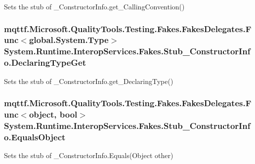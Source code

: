 Sets the stub of \-\_\-\-Constructor\-Info.\-get\-\_\-\-Calling\-Convention()

\hypertarget{class_system_1_1_runtime_1_1_interop_services_1_1_fakes_1_1_stub___constructor_info_a1eb244a5c2585282594fb4e58bd11649}{
\subsubsection[{Declaring\-Type\-Get}]{\setlength{\rightskip}{0pt plus 5cm}mqttf.\-Microsoft.\-Quality\-Tools.\-Testing.\-Fakes.\-Fakes\-Delegates.\-Func$<$global.\-System.\-Type$>$ System.\-Runtime.\-Interop\-Services.\-Fakes.\-Stub\-\_\-\-Constructor\-Info.\-Declaring\-Type\-Get}}\label{class_system_1_1_runtime_1_1_interop_services_1_1_fakes_1_1_stub___constructor_info_a1eb244a5c2585282594fb4e58bd11649}


Sets the stub of \-\_\-\-Constructor\-Info.\-get\-\_\-\-Declaring\-Type()

\hypertarget{class_system_1_1_runtime_1_1_interop_services_1_1_fakes_1_1_stub___constructor_info_ad4e31c70650168667292873983fb7b53}{
\subsubsection[{Equals\-Object}]{\setlength{\rightskip}{0pt plus 5cm}mqttf.\-Microsoft.\-Quality\-Tools.\-Testing.\-Fakes.\-Fakes\-Delegates.\-Func$<$object, bool$>$ System.\-Runtime.\-Interop\-Services.\-Fakes.\-Stub\-\_\-\-Constructor\-Info.\-Equals\-Object}}\label{class_system_1_1_runtime_1_1_interop_services_1_1_fakes_1_1_stub___constructor_info_ad4e31c70650168667292873983fb7b53}


Sets the stub of \-\_\-\-Constructor\-Info.\-Equals(\-Object other)


